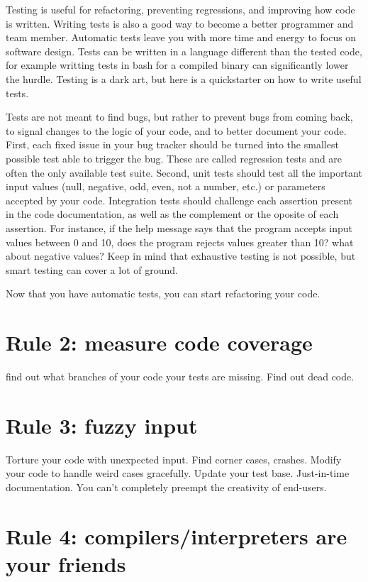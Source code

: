 \documentclass[10pt,letterpaper]{article}
\begin{document}
Testing is useful for refactoring, preventing regressions, and
improving how code is written. Writing tests is also a good way to
become a better programmer and team member. Automatic tests leave you
with more time and energy to focus on software design. Tests can be
written in a language different than the tested code, for example
writting tests in bash for a compiled binary can significantly lower
the hurdle. Testing is a dark art, but here is a quickstarter on how
to write useful tests.

Tests are not meant to find bugs, but rather to prevent bugs from
coming back, to signal changes to the logic of your code, and to
better document your code. First, each fixed issue in your bug tracker
should be turned into the smallest possible test able to trigger the
bug. These are called regression tests and are often the only
available test suite. Second, unit tests should test all the important
input values (null, negative, odd, even, not a number, etc.) or
parameters accepted by your code. Integration tests should challenge
each assertion present in the code documentation, as well as the
complement or the oposite of each assertion. For instance, if the help
message says that the program accepts input values between 0 and 10,
does the program rejects values greater than 10? what about negative
values?  Keep in mind that exhaustive testing is not possible, but
smart testing can cover a lot of ground.

Now that you have automatic tests, you can start refactoring your
code.

\section*{Rule 2: measure code coverage}

find out what branches of your code your tests are missing. Find out
dead code.

\section*{Rule 3: fuzzy input}

Torture your code with unexpected input. Find corner cases,
crashes. Modify your code to handle weird cases gracefully. Update
your test base. Just-in-time documentation. You can't completely
preempt the creativity of end-users.

\section*{Rule 4: compilers/interpreters are your friends}
\end{document}
